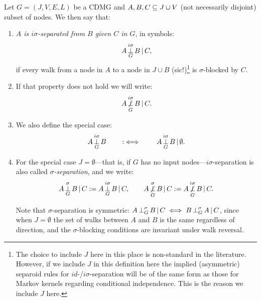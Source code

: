 \begin{defmark}
\begin{Def}\label{def:sigma_separation}
    Let $G=(J,V,E,L)$ be a CDMG and $A,B,C \subseteq J \cup V$ (not necessarily disjoint) subset of nodes.
    We then say that:
    \begin{enumerate}
        \item \emph{$A$ is $i\sigma$-separated from $B$ given $C$ in $G$}, in symbols:
    \[ A \operatorname*{\perp}^{i\sigma}_G B \operatorname*{|} C, \]
    if every walk from a node in $A$ to a node in $J \cup B$ (sic!)\footnote{The choice to include $J$ here in this place is non-standard in the literature. However, if we include $J$ in this definition here the implied (asymmetric) separoid rules for $id$-/$i\sigma$-separation will be of the same form as those for Markov kernels regarding conditional independence. This is the reason we include $J$ here.\label{fn:why-J}} is $\sigma$-blocked by $C$.
        \item If that property does not hold we will write:
            \[ A \operatorname*{\not\perp}^{i\sigma}_G B \operatorname*{|} C. \]
        \item We also define the special case:
                \[ A \operatorname*{\perp}^{i\sigma}_G B \qquad :\iff \qquad A \operatorname*{\perp}^{i\sigma}_G B \operatorname*{|} \emptyset.\]
        \item For the special case $J = \emptyset$---that is, if $G$ has no input nodes---$i\sigma$-separation is also called \emph{$\sigma$-separation}, and we write:
          \[A \operatorname*{\perp}^{\sigma}_G B \operatorname*{|} C := A \operatorname*{\perp}^{i\sigma}_G B \operatorname*{|} C, \qquad A \operatorname*{\not\perp}^{\sigma}_G B \operatorname*{|} C := A \operatorname*{\not\perp}^{i\sigma}_G B \operatorname*{|} C.\]
          \begin{claimmark}
          Note that $\sigma$-separation is symmetric: $A \operatorname*{\perp}^{\sigma}_G B \operatorname*{|} C \iff B \operatorname*{\perp}^{\sigma}_G A \operatorname*{|} C$, since when $J = \emptyset$ the set of walks between $A$ and $B$ is the same regardless of direction, and the $\sigma$-blocking conditions are invariant under walk reversal.
          \end{claimmark}
    \end{enumerate}
\end{Def}
\end{defmark}



